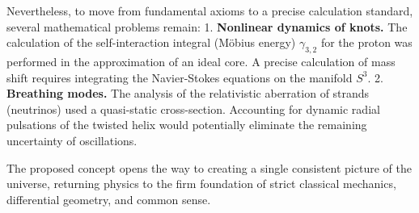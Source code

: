 \documentclass[11pt,a4paper]{article}
\begin{document}
Nevertheless, to move from fundamental axioms to a precise calculation standard, several mathematical problems remain:
1. \textbf{Nonlinear dynamics of knots.} The calculation of the self-interaction integral (Möbius energy) $\gamma_{3,2}$ for the proton was performed in the approximation of an ideal core. A precise calculation of mass shift requires integrating the Navier-Stokes equations on the manifold $S^3$.
2. \textbf{Breathing modes.} The analysis of the relativistic aberration of strands (neutrinos) used a quasi-static cross-section. Accounting for dynamic radial pulsations of the twisted helix would potentially eliminate the remaining uncertainty of oscillations.

The proposed concept opens the way to creating a single consistent picture of the universe, returning physics to the firm foundation of strict classical mechanics, differential geometry, and common sense.
\end{document}
